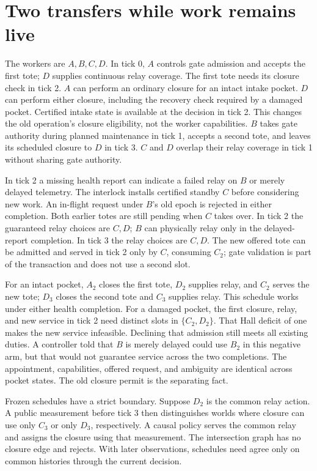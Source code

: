 \documentclass[11pt]{article}
\begin{document}
\section{Two transfers while work remains live}
The workers are $A,B,C,D$. In tick 0, $A$ controls gate admission and accepts the first tote; $D$ supplies continuous relay coverage. The first tote needs its closure check in tick 2. $A$ can perform an ordinary closure for an intact intake pocket. $D$ can perform either closure, including the recovery check required by a damaged pocket. Certified intake state is available at the decision in tick 2. This changes the old operation's closure eligibility, not the worker capabilities. $B$ takes gate authority during planned maintenance in tick 1, accepts a second tote, and leaves its scheduled closure to $D$ in tick 3. $C$ and $D$ overlap their relay coverage in tick 1 without sharing gate authority.

In tick 2 a missing health report can indicate a failed relay on $B$ or merely delayed telemetry. The interlock installs certified standby $C$ before considering new work. An in-flight request under $B$'s old epoch is rejected in either completion. Both earlier totes are still pending when $C$ takes over. In tick 2 the guaranteed relay choices are $C,D$; $B$ can physically relay only in the delayed-report completion. In tick 3 the relay choices are $C,D$. The new offered tote can be admitted and served in tick 2 only by $C$, consuming $C_2$; gate validation is part of the transaction and does not use a second slot.

For an intact pocket, $A_2$ closes the first tote, $D_2$ supplies relay, and $C_2$ serves the new tote; $D_3$ closes the second tote and $C_3$ supplies relay. This schedule works under either health completion. For a damaged pocket, the first closure, relay, and new service in tick 2 need distinct slots in $\{C_2,D_2\}$. That Hall deficit of one makes the new service infeasible. Declining that admission still meets all existing duties. A controller told that $B$ is merely delayed could use $B_2$ in this negative arm, but that would not guarantee service across the two completions. The appointment, capabilities, offered request, and ambiguity are identical across pocket states. The old closure permit is the separating fact.

Frozen schedules have a strict boundary. Suppose $D_2$ is the common relay action. A public measurement before tick 3 then distinguishes worlds where closure can use only $C_3$ or only $D_3$, respectively. A causal policy serves the common relay and assigns the closure using that measurement. The intersection graph has no closure edge and rejects. With later observations, schedules need agree only on common histories through the current decision.
\end{document}
